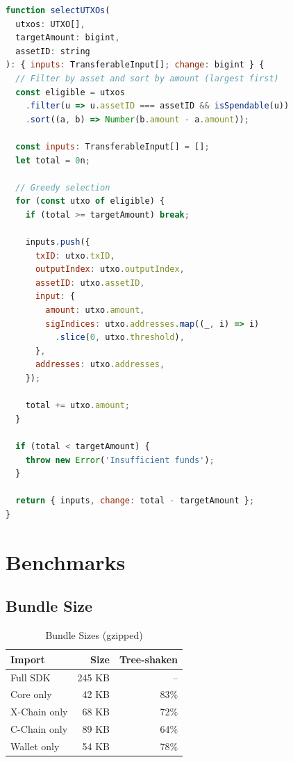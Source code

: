 \documentclass[11pt,twocolumn]{article}
\begin{document}
\begin{lstlisting}[language=JavaScript,caption=UTXO Selection]
function selectUTXOs(
  utxos: UTXO[],
  targetAmount: bigint,
  assetID: string
): { inputs: TransferableInput[]; change: bigint } {
  // Filter by asset and sort by amount (largest first)
  const eligible = utxos
    .filter(u => u.assetID === assetID && isSpendable(u))
    .sort((a, b) => Number(b.amount - a.amount));

  const inputs: TransferableInput[] = [];
  let total = 0n;

  // Greedy selection
  for (const utxo of eligible) {
    if (total >= targetAmount) break;

    inputs.push({
      txID: utxo.txID,
      outputIndex: utxo.outputIndex,
      assetID: utxo.assetID,
      input: {
        amount: utxo.amount,
        sigIndices: utxo.addresses.map((_, i) => i)
          .slice(0, utxo.threshold),
      },
      addresses: utxo.addresses,
    });

    total += utxo.amount;
  }

  if (total < targetAmount) {
    throw new Error('Insufficient funds');
  }

  return { inputs, change: total - targetAmount };
}
\end{lstlisting}

\section{Benchmarks}

\subsection{Bundle Size}

\begin{table}[h]
\centering
\caption{Bundle Sizes (gzipped)}
\begin{tabular}{lrr}
\toprule
\textbf{Import} & \textbf{Size} & \textbf{Tree-shaken} \\
\midrule
Full SDK & 245 KB & -- \\
Core only & 42 KB & 83\% \\
X-Chain only & 68 KB & 72\% \\
C-Chain only & 89 KB & 64\% \\
Wallet only & 54 KB & 78\% \\
\bottomrule
\end{tabular}
\end{table}
\end{document}
